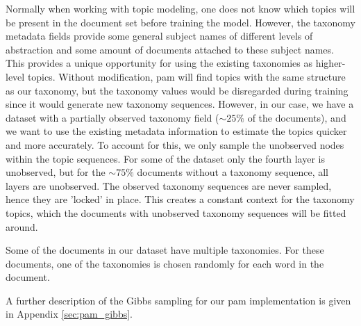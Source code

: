 




Normally when working with topic modeling, one does not know which topics will be present in the document set before training the model.
However, the taxonomy metadata fields provide some general subject names of different levels of abstraction and some amount of documents attached to these subject names.
This provides a unique opportunity for using the existing taxonomies as higher-level topics.
Without modification, \gls{pam} will find topics with the same structure as our taxonomy, but the taxonomy values would be disregarded during training since it would generate new taxonomy sequences.
However, in our case, we have a dataset with a partially observed taxonomy field (${\sim}25\%$ of the documents), and we want to use the existing metadata information to estimate the topics quicker and more accurately.
To account for this, we only sample the unobserved nodes within the topic sequences.
For some of the dataset only the fourth layer is unobserved, but for the ${\sim}75\%$ documents without a taxonomy sequence, all layers are unobserved.
The observed taxonomy sequences are never sampled, hence they are 'locked' in place.
This creates a constant context for the taxonomy topics, which the documents with unobserved taxonomy sequences will be fitted around.

Some of the documents in our dataset have multiple taxonomies.
For these documents, one of the taxonomies is chosen randomly for each word in the document. 

A further description of the Gibbs sampling for our \gls{pam} implementation is given in Appendix \autoref{sec:pam_gibbs}.
